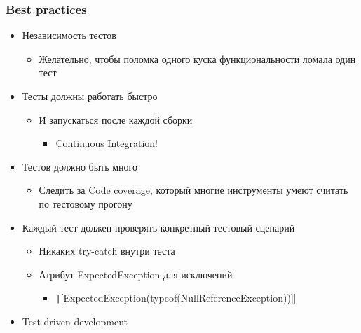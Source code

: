 \documentclass[xetex,mathserif,serif]{beamer}
\begin{document}
	\begin{frame}
		\frametitle{Best practices}
		\begin{itemize}
			\item Независимость тестов
			\begin{itemize}
				\item Желательно, чтобы поломка одного куска функциональности ломала один тест
			\end{itemize}
			\item Тесты должны работать быстро
			\begin{itemize}
				\item И запускаться после каждой сборки
				\begin{itemize}
					\item Continuous Integration!
				\end{itemize}
			\end{itemize}
			\item Тестов должно быть много
			\begin{itemize}
				\item Следить за Code coverage, который многие инструменты умеют считать по тестовому прогону
			\end{itemize}
			\item Каждый тест должен проверять конкретный тестовый сценарий
			\begin{itemize}
				\item Никаких try-catch внутри теста
				\item Атрибут ExpectedException для исключений
				\begin{itemize}
					\item \texttt|[ExpectedException(typeof(NullReferenceException))]|
				\end{itemize}
			\end{itemize}
			\item Test-driven development
		\end{itemize}
	\end{frame}
\end{document}
